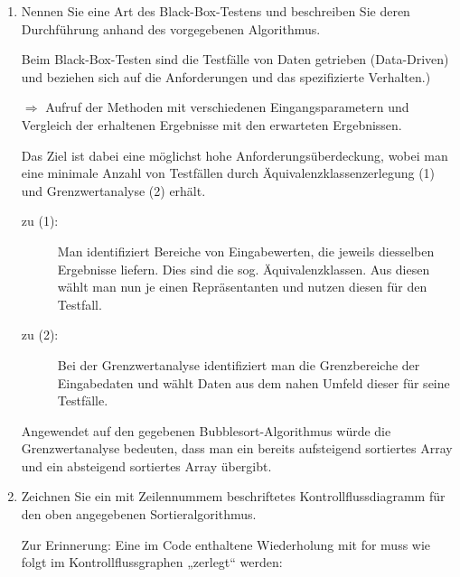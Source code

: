 \documentclass{bschlangaul-aufgabe}
\begin{document}
\begin{enumerate}


\item Nennen Sie eine Art des Black-Box-Testens
und beschreiben Sie deren Durchführung anhand des vorgegebenen
Algorithmus.

\begin{bAntwort}
Beim Black-Box-Testen sind die Testfälle von Daten getrieben
(Data-Driven) und beziehen sich auf die Anforderungen und das
spezifizierte Verhalten.)

$\Rightarrow$ Aufruf der Methoden mit verschiedenen
Eingangsparametern und Vergleich der erhaltenen Ergebnisse mit den
erwarteten Ergebnissen.

Das Ziel ist dabei eine möglichst hohe
Anforderungsüberdeckung, wobei man eine
minimale Anzahl von Testfällen durch
Äquivalenzklassenzerlegung (1) und
Grenzwertanalyse (2) erhält.

\begin{description}
\item[zu (1):] Man identifiziert Bereiche von Eingabewerten, die jeweils
diesselben Ergebnisse liefern. Dies sind die sog. Äquivalenzklassen. Aus
diesen wählt man nun je einen Repräsentanten und nutzen diesen für den
Testfall.

\item[zu (2):] Bei der Grenzwertanalyse identifiziert man die
Grenzbereiche der Eingabedaten und wählt Daten aus dem nahen Umfeld
dieser für seine Testfälle.
\end{description}

Angewendet auf den gegebenen Bubblesort-Algorithmus würde die
Grenzwertanalyse bedeuten, dass man ein bereits aufsteigend sortiertes
Array und ein absteigend sortiertes Array übergibt.
\end{bAntwort}


\item Zeichnen Sie ein mit Zeilennummem beschriftetes
Kontrollflussdiagramm für den oben angegebenen
Sortieralgorithmus.

\begin{bAntwort}
Zur Erinnerung: Eine im Code enthaltene Wiederholung mit for muss wie
folgt im Kontrollflussgraphen „zerlegt“ werden:
\end{bAntwort}


\end{enumerate}
\end{document}
